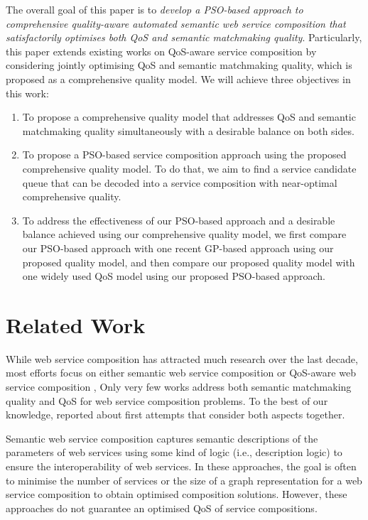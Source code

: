 \documentclass{llncs}
\begin{document}
The overall goal of this paper is to \textit{develop a PSO-based approach to comprehensive quality-aware automated semantic web service composition that satisfactorily optimises both QoS and semantic matchmaking quality}. Particularly, this paper extends existing works on QoS-aware service composition by considering jointly optimising QoS and semantic matchmaking quality, which is proposed as a comprehensive quality model. We will achieve three objectives in this work:

\begin{enumerate}
 \item To propose a comprehensive quality model that addresses QoS and semantic matchmaking quality simultaneously with a desirable balance on both sides.
  
 \item To propose a PSO-based service composition approach using the proposed comprehensive quality model. To do that, we aim to find a service candidate queue that can be decoded into a service composition with near-optimal comprehensive quality.  
 \item To address the effectiveness of our PSO-based approach and a desirable balance achieved using our comprehensive quality model, we first compare our PSO-based approach with one recent GP-based approach \cite{ma2015hybrid} using our proposed quality model, and then compare our proposed quality model with one widely used QoS model using our proposed PSO-based approach.
\end{enumerate}
\vspace{-0.5cm}
\section{Related Work} \label{relatedWork}
While web service composition has attracted much research over the last decade, most efforts focus on either semantic web service composition \cite{bansal2016generalized,boustil2014semantic,mier2015integrated} or QoS-aware web service composition \cite{gupta2015optimization,ma2015hybrid,qi2010combining,da2016particle,da2015graphevol,yu2013adaptive}, Only very few works address both semantic matchmaking quality and QoS for web service composition problems. To the best of our knowledge, \cite{fanjiang2014semantic,lecue2009optimizing,pop2009immune} reported about first attempts that consider both aspects together.

Semantic web service composition \cite{bansal2016generalized,boustil2014semantic,mier2015integrated} captures semantic descriptions of the parameters of web services using some kind of logic (i.e., description logic) to ensure the interoperability of web services. In these approaches, the goal is often to minimise the number of services or the size of a graph representation for a web service composition to obtain optimised composition solutions. However, these approaches do not guarantee an optimised QoS of service compositions.
\end{document}
